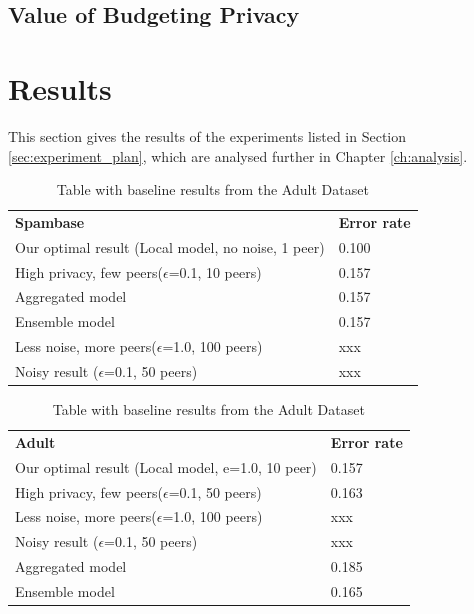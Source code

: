 \subsection{Value of Budgeting Privacy}

\section{Results}

This section gives the results of the experiments listed in Section \ref{sec:experiment_plan}, which are analysed further in Chapter \ref{ch:analysis}.

\begin{table}[h]
	\begin{tabular}{ll}
		\textbf{Spambase} & \textbf{Error rate}\\
		Our optimal result (Local model, no noise, 1 peer)                & 0.100  \\
		High privacy, few peers($\epsilon$=0.1, 10 peers)				  & 0.157  \\
		Aggregated model				                                  & 0.157  \\
		Ensemble model				                                      & 0.157  \\
		Less noise, more peers($\epsilon$=1.0, 100 peers)				  & xxx  \\
		Noisy result ($\epsilon$=0.1, 50 peers)                           & xxx  \\
		
		
	\end{tabular}
	\caption{Table with baseline results from the Adult Dataset}
	\label{tab:baseline_class_results_spambase}
\end{table}

\begin{table}[h]
	\begin{tabular}{ll}
		\textbf{Adult} & \textbf{Error rate} \\
		Our optimal result (Local model, e=1.0, 10 peer)                  & 0.157 \\
		High privacy, few peers($\epsilon$=0.1, 50 peers)				  & 0.163  \\
		Less noise, more peers($\epsilon$=1.0, 100 peers)				  & xxx  \\
		Noisy result ($\epsilon$=0.1, 50 peers)                           & xxx  \\
		Aggregated model												  & 0.185 \\
		Ensemble model													  &	0.165
	\end{tabular}
	\caption{Table with baseline results from the Adult Dataset}
	\label{tab:baseline_class_results_adult}
\end{table}

